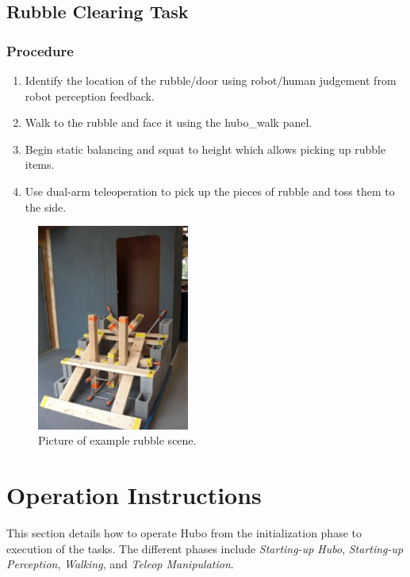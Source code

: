 \documentclass[letterpaper, 10 pt]{report}
\begin{document}
\newpage

%
\section{Rubble Clearing Task}\label{chap:rubble-clearing-task}
\subsection{Procedure}
\begin{enumerate}
\item Identify the location of the rubble/door using robot/human judgement from robot perception feedback.
\item Walk to the rubble and face it using the hubo\_walk panel.
\item Begin static balancing and squat to height which allows picking up rubble items.
\item Use dual-arm teleoperation to pick up the pieces of rubble and toss them to the side.
\end{enumerate}
\begin{figure}[ht]
  \centering
  \includegraphics[width=5.0cm]{figures/rubble-clearing}
  \caption{Picture of example rubble scene.}
  \label{fig:Rubble-image}
\end{figure}

\newpage

%
\chapter{Operation Instructions}\label{chap:operating-instructions}
This section details how to operate Hubo from the initialization phase to execution of the tasks. The different phases include \textit{Starting-up Hubo}, \textit{Starting-up Perception}, \textit{Walking}, and \textit{Teleop Manipulation}.
\end{document}
